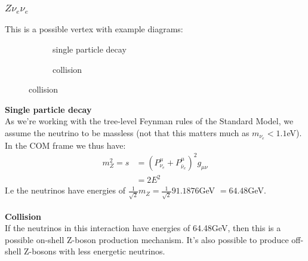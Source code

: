 \documentclass[10pt,a4paper,twoside]{article}
\begin{document}
\subsubsection{$Z\nu_e\nu_e$}
This is a possible vertex with example diagrams:
\begin{figure}[H]
	\centering
	\begin{subfigure}{0.49\textwidth}
		\centering
		\caption{single particle decay}
	\end{subfigure}
	\begin{subfigure}{0.49\textwidth}
		\centering
		\caption{collision}
	\end{subfigure}
\end{figure}
\noindent
\textbf{Single particle decay}\\
As we're working with the tree-level Feynman rules of the Standard Model, we assume the neutrino to be massless (not that this matters much as $m_{\nu_e}<1.1$eV). In the COM frame we thus have:
\begin{align}
	m_Z^2 = s &= (P^\mu_{\nu_e} + P^\mu_{\bar{\nu}_e})^2g_{\mu\nu}\\
	&= 2E^2
\end{align}
I.e the neutrinos have energies of $\frac{1}{\sqrt{2}}m_Z =\frac{1}{\sqrt{2}}91.1876$GeV $=64.48$GeV.
\\\\
\textbf{Collision}\\
If the neutrinos in this interaction have energies of 64.48GeV, then this is a possible on-shell Z-boson production mechanism. It's also possible to produce off-shell Z-bosons with less energetic neutrinos. 
\end{document}
